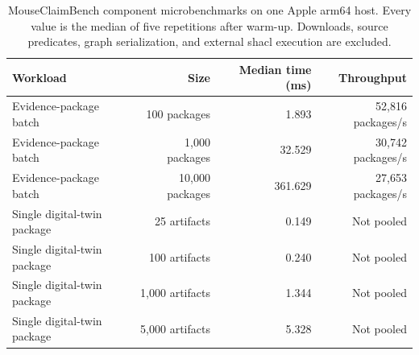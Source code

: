 \begin{table}[!htbp]
\centering
\caption{MouseClaimBench component microbenchmarks on one Apple arm64 host. Every value is the median of five repetitions after warm-up. Downloads, source predicates, graph serialization, and external \ac{shacl} execution are excluded.}
\label{tab:scalability-results}
\footnotesize
\renewcommand{\arraystretch}{1.05}
\begin{tabularx}{\textwidth}{@{}Y r r r@{}}
\toprule
Workload & Size & Median time (ms) & Throughput \\
\midrule
Evidence-package batch & 100 packages & 1.893 & 52,816 packages/s \\
Evidence-package batch & 1,000 packages & 32.529 & 30,742 packages/s \\
Evidence-package batch & 10,000 packages & 361.629 & 27,653 packages/s \\
Single digital-twin package & 25 artifacts & 0.149 & Not pooled \\
Single digital-twin package & 100 artifacts & 0.240 & Not pooled \\
Single digital-twin package & 1,000 artifacts & 1.344 & Not pooled \\
Single digital-twin package & 5,000 artifacts & 5.328 & Not pooled \\
\bottomrule
\end{tabularx}
\end{table}
